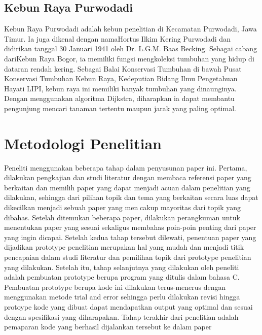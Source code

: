 \documentclass[conference]{IEEEtran}
\begin{document}
\subsection{Kebun Raya Purwodadi}
Kebun Raya Purwodadi adalah kebun penelitian di Kecamatan Purwodadi, Jawa Timur. Ia juga dikenal dengan namaHortus Ilkim Kering Purwodadi dan didirikan tanggal 30 Januari 1941 oleh Dr. L.G.M. Baas Becking. Sebagai cabang dariKebun Raya Bogor, ia memiliki fungsi mengkoleksi tumbuhan yang hidup di dataran rendah kering. Sebagai Balai Konservasi Tumbuhan di bawah Pusat Konservasi Tumbuhan Kebun Raya, Kedeputian Bidang Ilmu Pengetahuan Hayati LIPI, kebun raya ini memiliki banyak tumbuhan yang dinaunginya. Dengan menggunakan algoritma Dijkstra, diharapkan ia dapat membantu pengunjung mencari tanaman tertentu maupun jarak yang paling optimal.


\section{Metodologi Penelitian}

Peneliti menggunakan beberapa tahap dalam penyusunan paper ini. Pertama, dilakukan pengkajian dan studi literatur dengan membaca referensi paper yang berkaitan dan memilih paper yang dapat menjadi acuan dalam penelitian yang dilakukan, sehingga dari pilihan topik dan tema yang berkaitan secara luas dapat dikecilkan menjadi sebuah paper yang mencakup mayoritas dari topik yang dibahas. Setelah ditemukan beberapa paper, dilakukan perangkuman untuk menentukan paper yang sesuai sekaligus membahas poin-poin penting dari paper yang ingin dicapai. Setelah kedua tahap tersebut dilewati, penentuan paper yang dijadikan prototype penelitian merupakan hal yang mudah dan menjadi titik pencapaian dalam studi literatur dan pemilihan topik dari prototype penelitian yang dilakukan.
Setelah itu, tahap selanjutnya yang dilakukan oleh peneliti adalah pembuatan prototype berupa program yang ditulis dalam bahasa C. Pembuatan prototype berupa kode ini dilakukan terus-menerus dengan menggunakan metode trial and
error sehingga perlu dilakukan revisi hingga protoype kode yang dibuat dapat mendapatkan output yang optimal dan sesuai dengan spesifikasi yang diharapakan. Tahap terakhir dari penelitian adalah pemaparan kode yang berhasil dijalankan tersebut ke dalam paper


\end{document}
